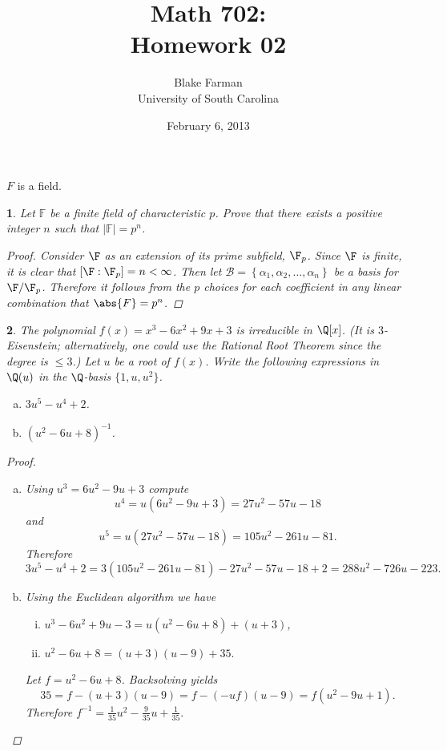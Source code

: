 \documentclass[10pt]{amsart}
\author{Blake Farman\\University of South Carolina}
\title{Math 702:\\Homework 02}
\date{February 6, 2013}
\begin{document}
\maketitle

\providecommand{\p}{\mathfrak{p}}
\providecommand{\m}{\mathfrak{m}}

\newtheorem{thm}{}
\newtheorem{lem}{Lemma}

$F$ is a field.
\begin{thm}\label{Ex1}
  Let $\mathbb{F}$ be a finite field of characteristic $p$.  Prove that there exists a positive integer $n$
  such that  $|\mathbb{F}| = p^n$.
  \begin{proof}
    Consider $\F$ as an extension of its prime subfield, $\F_p$.
    Since $\F$ is finite, it is clear that $[\F:\F_p] = n < \infty$.
    Then let $\mathcal{B} = \left\{\alpha_1, \alpha_2, \ldots, \alpha_n\right\}$ be a basis for $\F/\F_p$.
    Therefore it follows from the $p$ choices for each coefficient in any linear combination that $\abs{F} = p^n$.
  \end{proof}
\end{thm}

\begin{thm}
  The polynomial $f(x) = x^3 - 6x^2 + 9x + 3$ is irreducible in $\Q[x]$.  (It is $3$-Eisenstein; alternatively, one 
  could use the Rational Root Theorem since the degree is $\leq 3$.)  Let $u$ be a root of $f(x)$.
  Write the following expressions in $\Q(u)$ in the $\Q$-basis $\{1, u, u^2\}$.
  \begin{enumerate}[(a)]
  \item
    $3u^5 - u^4 + 2$.
  \item
    $(u^2 - 6u + 8)^{-1}$.
  \end{enumerate}

  \begin{proof}
    \begin{enumerate}[(a)]
    \item
      Using $u^3 = 6u^2 - 9u + 3$ compute 
      $$u^4 = u(6u^2 - 9u + 3) = 27u^2 - 57u - 18$$ 
      and
      $$u^5 = u(27u^2 - 57u - 18) = 105u^2 - 261u - 81.$$
      Therefore 
      $$3u^5 - u^4 + 2 = 3(105u^2 - 261u - 81) - 27u^2 - 57u - 18 + 2 = 288u^2 - 726u - 223.$$
    \item
      Using the Euclidean algorithm we have
      \begin{enumerate}[(i)]
      \item
        $u^3 - 6u^2 + 9u - 3 = u(u^2 - 6u + 8) + (u + 3)$,
      \item
        $u^2 - 6u + 8 = (u+3)(u-9) + 35.$
      \end{enumerate}
      Let $f = u^2 - 6u + 8$.
      Backsolving yields $$35 = f - (u + 3)(u - 9) = f - (-uf)(u - 9)= f(u^2 - 9u + 1).$$
      Therefore $f^{-1} = \frac{1}{35}u^2 - \frac{9}{35}u + \frac{1}{35}.$
    \end{enumerate}
  \end{proof}
\end{thm}
\end{document}
